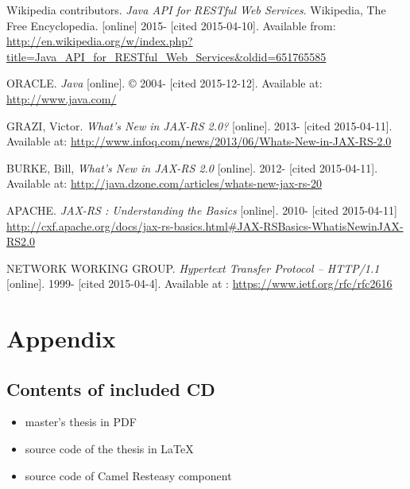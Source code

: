 \documentclass[12pt,final,oneside]{fithesis2}
\begin{document}
\begin{thebibliography}{}
Wikipedia contributors. \textit{Java API for RESTful Web Services}. Wikipedia, The Free Encyclopedia. [online] 2015- [cited 2015-04-10]. Available from: \url{http://en.wikipedia.org/w/index.php?title=Java_API_for_RESTful_Web_Services&oldid=651765585} 


 ORACLE. \textit{Java} [online]. \copyright{} 2004- [cited 2015-12-12]. Available at: \url{http://www.java.com/}		

 GRAZI, Victor. \textit{What's New in JAX-RS 2.0?} [online]. 2013- [cited 2015-04-11]. Available at: \url{http://www.infoq.com/news/2013/06/Whats-New-in-JAX-RS-2.0}

 BURKE, Bill, \textit{What's New in JAX-RS 2.0} [online]. 2012- [cited 2015-04-11]. Available at: \url{http://java.dzone.com/articles/whats-new-jax-rs-20} 	

 APACHE. \textit{JAX-RS : Understanding the Basics} [online]. 2010- [cited 2015-04-11] \url{http://cxf.apache.org/docs/jax-rs-basics.html\#JAX-RSBasics-WhatisNewinJAX-RS2.0}

 NETWORK WORKING GROUP. \textit{Hypertext Transfer Protocol -- HTTP/1.1
} [online]. 1999- [cited 2015-04-4]. Available at : \url{https://www.ietf.org/rfc/rfc2616}

%

%
%




\end{thebibliography}

\endgroup
\appendix

\chapter{Appendix}

\section{Contents of included CD}
\begin{itemize}
\item
 master’s thesis in PDF
 
 \item
 source code of the thesis in \LaTeX
 
 \item
 source code of Camel Resteasy component
\end{itemize}
\end{document}
